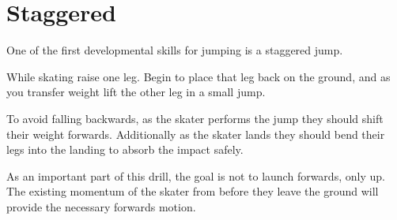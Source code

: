 \section{Staggered}
\label{sec:jumping/staggered}

One of the first developmental skills for jumping is a staggered jump. 

While skating raise one leg.
Begin to place that leg back on the ground, and as you transfer weight lift the other leg in a small jump.

To avoid falling backwards, as the skater performs the jump they should shift their weight forwards. 
Additionally as the skater lands they should bend their legs into the landing to absorb the impact safely. 

As an important part of this drill, the goal is not to launch forwards, only up. 
The existing momentum of the skater from before they leave the ground will provide the necessary forwards motion.    



